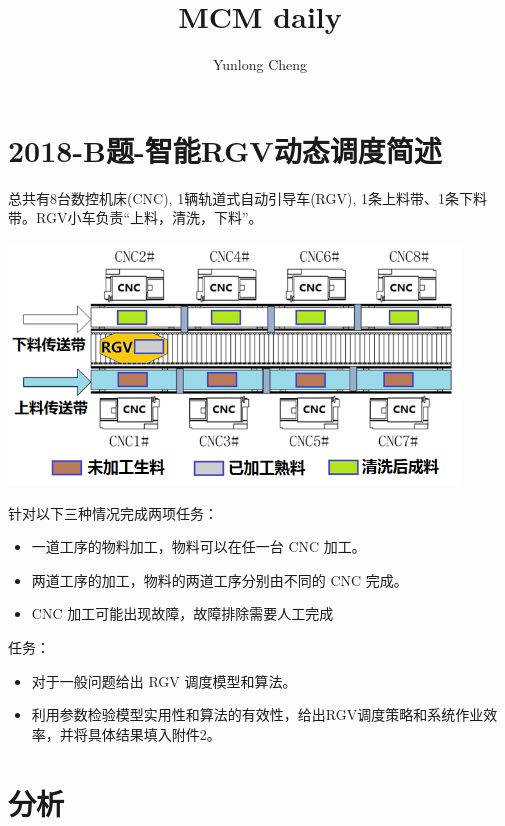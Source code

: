 \documentclass[12pt,a4paper]{article}
\title{MCM daily}
\author{Yunlong Cheng}
\begin{document}
\maketitle
\section{2018-B题-智能RGV动态调度简述}
总共有8台数控机床(CNC), 1辆轨道式自动引导车(RGV), 1条上料带、1条下料带。RGV小车负责“上料，清洗，下料”。

\begin{center}
  \includegraphics[width = 0.9\textwidth]{figures/illustrate-diagram.png}
\end{center}
针对以下三种情况完成两项任务：
\begin{itemize}
  \item 一道工序的物料加工，物料可以在任一台 CNC 加工。
  \item 两道工序的加工，物料的两道工序分别由不同的 CNC 完成。
  \item CNC 加工可能出现故障，故障排除需要人工完成
\end{itemize}
任务：
\begin{itemize}
  \item 对于一般问题给出 RGV 调度模型和算法。
  \item 利用参数检验模型实用性和算法的有效性，给出RGV调度策略和系统作业效率，并将具体结果填入附件2。
\end{itemize}

\section{分析}
\end{document}
